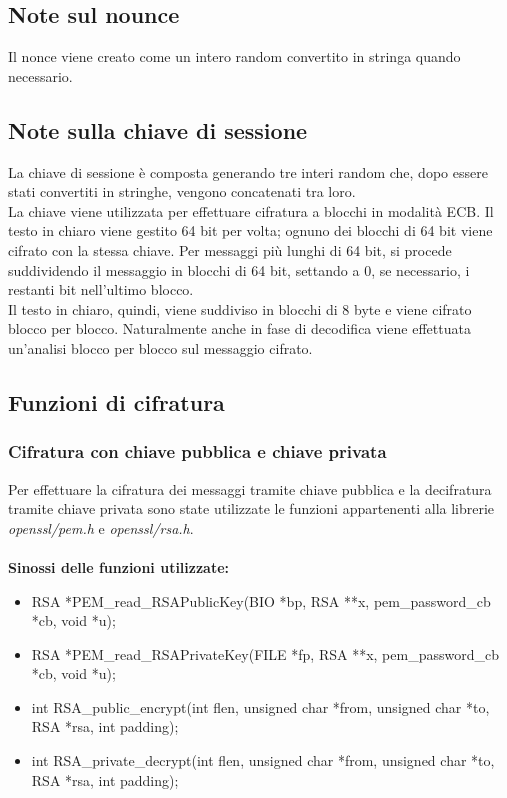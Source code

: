 \documentclass[12pt, a4paper]{article}
\begin{document}
\subsection{Note sul nounce}
Il nonce viene creato come un intero random convertito in stringa quando necessario.
\subsection{Note sulla chiave di sessione}
La chiave di sessione è composta generando tre interi random che, dopo essere stati convertiti in stringhe, vengono  concatenati tra loro.\\
La chiave viene utilizzata per effettuare cifratura a blocchi in modalità ECB. Il testo in chiaro viene gestito 64 bit per volta; ognuno dei blocchi di 64 bit viene cifrato con la stessa chiave. Per messaggi più lunghi di 64 bit, si procede suddividendo il messaggio in blocchi di 64 bit, settando a 0, se necessario, i restanti bit nell'ultimo blocco.\\
Il testo in chiaro, quindi, viene suddiviso in blocchi di 8 byte e viene cifrato blocco per blocco. Naturalmente anche in fase di decodifica viene effettuata un'analisi blocco per blocco sul messaggio cifrato.
\subsection{Funzioni di cifratura}
\subsubsection{Cifratura con chiave pubblica e chiave privata}
Per effettuare la cifratura dei messaggi tramite chiave pubblica e la decifratura tramite chiave privata sono state utilizzate le funzioni appartenenti alla librerie \textit{openssl/pem.h} e \textit{openssl/rsa.h}.\\\\
\textbf{Sinossi delle funzioni utilizzate:}
\begin{itemize}
\item
RSA *PEM\_read\_RSAPublicKey(BIO *bp, RSA **x, pem\_password\_cb *cb, void *u);
\item
RSA *PEM\_read\_RSAPrivateKey(FILE *fp, RSA **x, pem\_password\_cb *cb, void *u);
\item 
int RSA\_public\_encrypt(int flen, unsigned char *from, unsigned char *to, RSA *rsa, int padding);
\item
int RSA\_private\_decrypt(int flen, unsigned char *from, unsigned char *to, RSA *rsa, int padding);
\end{itemize}
\end{document}
